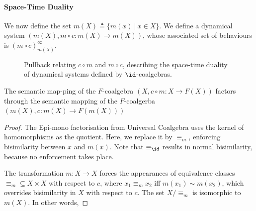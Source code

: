 
\paragraph{Space-Time Duality} 
We now define the set $m(X)\triangleq\{m(x)\ |\ x\in X\}$. We define a dynamical system $(m(X),m\circ c\colon m(X)\rightarrow m(X))$, whose associated set of behaviours is $(m\circ c)_{m(X)}^\infty$.

\begin{figure}[t]
    \centering
    \caption{Pullback relating $c\circ m$ and $m\circ c$, describing the space-time duality of dynamical systems defined by $\id$-coalgebras.}
\end{figure}

\begin{theorem}
    \label{theo:Fundamental}
    The semantic map-ping of the $F$-coalgebra $(X,c\circ m\colon X\rightarrow F(X))$ factors through the semantic mapping of the $F$-coalgerba $(m(X),c\colon m(X)\rightarrow F(m(X)))$
\end{theorem}
\begin{proof}
    The Epi-mono factorisation from Universal Coalgebra uses the kernel of homomorphisms as the quotient. Here, we replace it by $\equiv_m$, enforcing bisimilarity between $x$ and $m(x)$. Note that $\equiv_{\id}$ results in normal bisimilarity, because no enforcement takes place.

    The transformation $m\colon X\rightarrow X$ forces the appearances of equivalence classes $\equiv_m\subseteq X\times X$ with respect to $c$, where $x_1\equiv_m x_2$ iff $m(x_1)\sim m(x_2)$, which overrides bisimilarity in $X$ with respect to $c$. The set $X/\equiv_m$ is isomorphic to $m(X)$. In other words, 
\end{proof}

